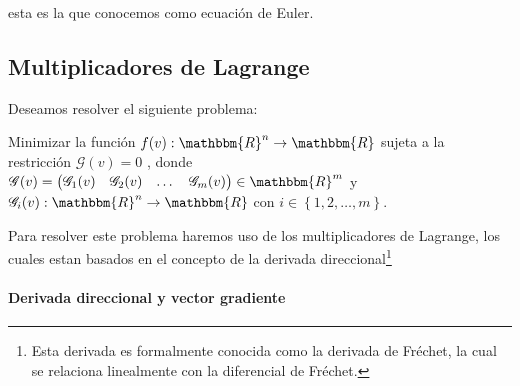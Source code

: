             esta es la que conocemos como ecuación de Euler.


        \subsection{Multiplicadores de Lagrange}

            Deseamos resolver el siguiente problema:

            Minimizar la función
            $f(v):\mathbbm{R}^n \to \mathbbm{R}$
            sujeta a la restricción $\mathscr{G}(v) = 0$
            , donde $\mathscr{G}(v)=\begin{pmatrix}\mathscr{G}_1(v) & \mathscr{G}_2(v) & \dots & \mathscr{G}_m(v) \end{pmatrix} \in \mathbbm{R}^m$
             y $\mathscr{G}_i(v): \mathbbm{R}^n \to \mathbbm{R}$
             con $i \in \left\{ 1, 2, \dots, m \right\}$.

            Para resolver este problema haremos uso de los multiplicadores de Lagrange, los cuales estan basados en el concepto de la derivada direccional\footnote{Esta derivada es formalmente conocida como la derivada de Fréchet, la cual se relaciona linealmente con la diferencial de Fréchet.}

            \paragraph{Derivada direccional y vector gradiente}

